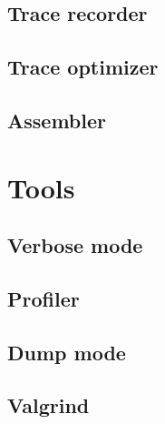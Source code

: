 \documentclass[12pt, oneside]{Thesis}
\begin{document}
    \section{Trace recorder}
    \label{Sec:TR}
    

    \section{Trace optimizer}
    \label{Sec:TO}
    

    \section{Assembler}
    \label{Sec:TA}
    

  \chapter{Tools}
  \label{Chapt:Tools}

    \section{Verbose mode}
    \label{Sec:Verbose}
    

    \section{Profiler}
    \label{Sec:Profiler}
    

    \section{Dump mode}
    \label{Sec:Dump-mode}
    

    \section{Valgrind}
    \label{Sec:Valgrind}
    

\clearpage
{}
\appendix
\baselineskip=16pt
\end{document}
